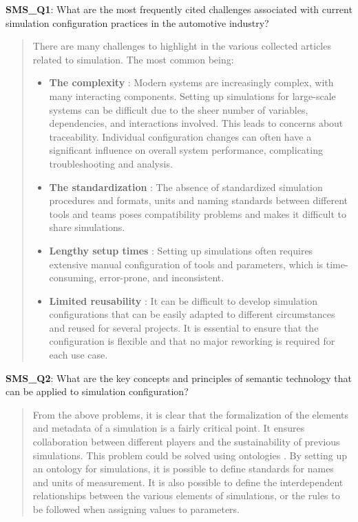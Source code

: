             \textbf{SMS\_Q1}: What are the most frequently cited challenges associated with current simulation configuration practices in the automotive industry?
            \begin{quote}
                There are many challenges to highlight in the various collected articles related to simulation. The most common being:

                \begin{itemize}
                    \item \textbf{The complexity} \cite{park2023generation, spelten2023simulation} : Modern systems are increasingly complex, with many interacting components. Setting up simulations for large-scale systems can be difficult due to the sheer number of variables, dependencies, and interactions involved. This leads to concerns about traceability. Individual configuration changes can often have a significant influence on overall system performance, complicating troubleshooting and analysis.
                    \item \textbf{The standardization} \cite{spelten2023simulation, horsch2021osmo} : The absence of standardized simulation procedures and formats, units and naming standards between different tools and teams poses compatibility problems and makes it difficult to share simulations.
                    \item \textbf{Lengthy setup times} \cite{horsch2021osmo}: Setting up simulations often requires extensive manual configuration of tools and parameters, which is time-consuming, error-prone, and inconsistent.
                    \item \textbf{Limited reusability} \cite{horsch2021osmo, spelten2023simulation}: It can be difficult to develop simulation configurations that can be easily adapted to different circumstances and reused for several projects. It is essential to ensure that the configuration is flexible and that no major reworking is required for each use case.\\
                \end{itemize}
            \end{quote}

            \textbf{SMS\_Q2}: What are the key concepts and principles of semantic technology that can be applied to simulation configuration?
            \begin{quote}
                From the above problems, it is clear that the formalization of the elements and metadata of a simulation is a fairly critical point. It ensures collaboration between different players and the sustainability of previous simulations. This problem could be solved using ontologies \cite{benjamin2006using, benjamin2007using}. By setting up an ontology for simulations, it is possible to define standards for names and units of measurement. It is also possible to define the interdependent relationships between the various elements of simulations, or the rules to be followed when assigning values to parameters.\\
            \end{quote}

